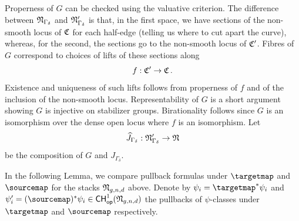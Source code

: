 \documentclass[a4paper,12pt]{article} %
\theoremstyle{definition}
\theoremstyle{plain}%
\newcommand{\Chow}{\mathsf{CH}}
\newcommand{\CHop}{\Chow_{\mathsf{op}}}
\begin{document}
Properness of $G$ can be checked using the valuative criterion. %
The difference between $\frak N_{\Gamma_\delta}$ and $\frak N'_{\Gamma_\delta}$ is that, in the first space, we have sections of the non-smooth locus of $\frak C$ for each half-edge (telling us where to cut apart the curve), whereas, for the second, the sections go to the non-smooth locus of $\frak C'$. Fibres of $G$ correspond to choices of lifts of these sections along $$f: \frak C' \to \frak C\, .$$
Existence and uniqueness of such lifts follows from properness of $f$ and of the inclusion of the non-smooth locus. 
Representability of $G$ is a short argument showing $G$ is injective on stabilizer groups. Birationality follows since $G$ is an isomorphism over the dense open locus where $f$ is an isomorphism.
Let $$\widehat J_{\Gamma_\delta} : \frak N'_{\Gamma_\delta} \to \frak N$$ be 
the composition of $G$ and $J_{\Gamma_\delta}$.

In the following Lemma, we compare pullback formulas under $\targetmap$ and $\sourcemap$ for the stacks $\frak N_{g,n,d}$ above. Denote by $\psi_i = \targetmap^*\psi_i$ and $\psi_i' = (\sourcemap)^*\psi_i \in \CHop^1(\frak N_{g,n,d})$ the pullbacks of $\psi$-classes under $\targetmap$ and  $\sourcemap$
respectively.
\end{document}
